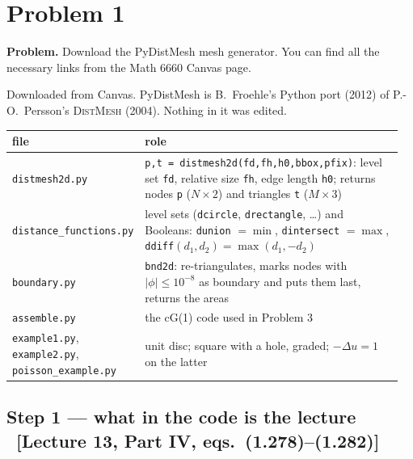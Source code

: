 \documentclass[11pt]{article}
\newcommand{\abs}[1]{\lvert #1\rvert}
\newcommand{\lap}{\Delta}
\newcommand{\src}[1]{{\small\color{black!55}\textsf{[#1]}}}
\newcommand{\problem}[2]{%
  \section*{Problem #1}%
  \renewcommand{\theequation}{#2.\arabic{equation}}%
  \setcounter{equation}{0}}
\begin{document}
\problem{1}{1}

\textbf{Problem.} Download the PyDistMesh mesh generator.  You can find all the
necessary links from the Math 6660 Canvas page.

\begin{steps}
\item Downloaded from Canvas.  PyDistMesh is B.~Froehle's Python port (2012)
      of P.-O.~Persson's \textsc{DistMesh} (2004).  Nothing in it was edited.
\end{steps}

\begin{center}
\begin{minipage}{\linewidth}
\centering\footnotesize
\begin{tabular}{@{}>{\raggedright\arraybackslash}p{0.27\linewidth}>{\raggedright\arraybackslash}p{0.69\linewidth}@{}}
\toprule
file & role\\
\midrule
\texttt{distmesh2d.py} & \texttt{p,t = distmesh2d(fd,fh,h0,bbox,pfix)}: level set
  \texttt{fd}, relative size \texttt{fh}, edge length \texttt{h0}; returns
  nodes \texttt{p} ($N\times2$) and triangles \texttt{t} ($M\times3$)\\
\texttt{distance\_functions.py} & level sets (\texttt{dcircle},
  \texttt{drectangle}, \dots) and Booleans: \texttt{dunion} $=\min$,
  \texttt{dintersect} $=\max$, \texttt{ddiff}$(d_1,d_2)=\max(d_1,-d_2)$\\
\texttt{boundary.py} & \texttt{bnd2d}: re-triangulates, marks nodes with
  $\abs{\phi}\le10^{-8}$ as boundary and puts them last, returns the areas\\
\texttt{assemble.py} & the cG(1) code used in Problem 3\\
\texttt{example1.py}, \texttt{example2.py}, \texttt{poisson\_example.py} &
  unit disc; square with a hole, graded; $-\lap u=1$ on the latter\\
\bottomrule
\end{tabular}
\label{tab:p1files}
\end{minipage}
\end{center}

\subsection*{Step 1 --- what in the code is the lecture
  \ \src{Lecture 13, Part IV, eqs.~(1.278)--(1.282)}}
\end{document}
